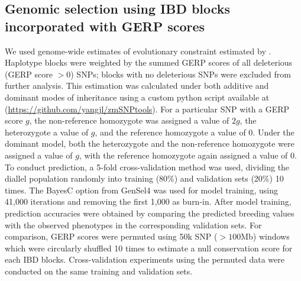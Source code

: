 \documentclass[9pt,twocolumn,twoside]{gsajnl}
\newcommand{\yang}[1]{\textcolor{cyan}{\emph{\bf  #1}} }
\begin{document}

\subsection*{Genomic selection using IBD blocks incorporated with GERP scores}

We used genome-wide estimates of evolutionary constraint \citep[GERP][]{Davydov2010} estimated by \citet{rodgers2015recombination}. 
Haplotype blocks were weighted by the summed GERP scores of all deleterious (GERP score $>0$) SNPs; blocks with no deleterious SNPs were excluded from further analysis. 
This estimation was calculated under both additive and dominant modes of inheritance using a custom python script available at (\url{https://github.com/yangjl/zmSNPtools}). 
For a particular SNP with a GERP score $g$, the non-reference homozygote was assigned a value of $2g$, the heterozygote a value of $g$, and the reference homozygote a value of 0.  
Under the dominant model, both the heterozygote and the non-reference homozygote were assigned a value of $g$, with the reference homozygote again assigned a value of 0.
To conduct prediction, a 5-fold cross-validation method was used, dividing the diallel population  randomly  into training (80\%) and validation sets (20\%)  10 times. 
The BayesC option from GenSel4 \citep{habier2011extension} was used for model training, using 41,000 iterations and removing the first 1,000 as burn-in. 
After model training, prediction accuracies were obtained by comparing the predicted breeding values with the observed phenotypes in the corresponding validation sets. 
For comparison, GERP scores were permuted using 50k SNP ($> 100$Mb) windows which were circularly shuffled 10 times to estimate a null conservation score for each IBD blocks. 
Cross-validation experiments using the permuted data were conducted on the same training and validation sets.  


\end{document}
